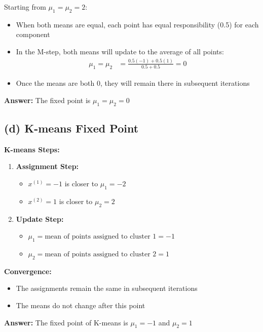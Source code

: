 \documentclass{article}
\begin{document}
Starting from $\mu_1 = \mu_2 = 2$:
\begin{itemize}
    \item When both means are equal, each point has equal responsibility (0.5) for each component
    \item In the M-step, both means will update to the average of all points:
    \begin{align*}
    \mu_1 = \mu_2 &= \frac{0.5(-1) + 0.5(1)}{0.5 + 0.5} = 0
    \end{align*}
    \item Once the means are both 0, they will remain there in subsequent iterations
\end{itemize}

\textbf{Answer:} The fixed point is $\mu_1 = \mu_2 = 0$

\subsection*{(d) K-means Fixed Point}

\textbf{K-means Steps:}
\begin{enumerate}
    \item \textbf{Assignment Step:}
    \begin{itemize}
        \item $x^{(1)} = -1$ is closer to $\mu_1 = -2$
        \item $x^{(2)} = 1$ is closer to $\mu_2 = 2$
    \end{itemize}
    
    \item \textbf{Update Step:}
    \begin{itemize}
        \item $\mu_1 = \text{mean of points assigned to cluster 1} = -1$
        \item $\mu_2 = \text{mean of points assigned to cluster 2} = 1$
    \end{itemize}
\end{enumerate}

\textbf{Convergence:}
\begin{itemize}
    \item The assignments remain the same in subsequent iterations
    \item The means do not change after this point
\end{itemize}

\textbf{Answer:} The fixed point of K-means is $\mu_1 = -1$ and $\mu_2 = 1$
\end{document}
